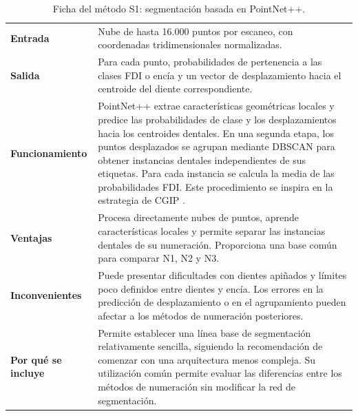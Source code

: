 \begin{table}[htbp]
    \centering
    \begin{tabular}{p{} >{\raggedright\arraybackslash}p{}}
         \hline 
         \textbf{Entrada} &
         Nube de hasta 16.000 puntos por escaneo, con coordenadas tridimensionales normalizadas. \\

         \textbf{Salida} &
         Para cada punto, probabilidades de pertenencia a las clases FDI o encía y un vector de desplazamiento hacia el centroide del diente correspondiente. \\

         \textbf{Funcionamiento} &
         PointNet++ \cite{qiPointNetDeepHierarchical2017} extrae características geométricas locales y predice las probabilidades de clase y los desplazamientos hacia los centroides dentales. En una segunda etapa, los puntos desplazados se agrupan mediante DBSCAN \cite{DBLP:conf/kdd/EsterKSX96} para obtener instancias dentales independientes de sus etiquetas. Para cada instancia se calcula la media de las probabilidades FDI. Este procedimiento se inspira en la estrategia de CGIP \cite{ben-hamadou3DTeethSeg223DTeeth2023}. \\

         \textbf{Ventajas} &
         Procesa directamente nubes de puntos, aprende características locales y permite separar las instancias dentales de su numeración. Proporciona una base común para comparar N1, N2 y N3. \\

         \textbf{Inconvenientes} &
         Puede presentar dificultades con dientes apiñados y límites poco definidos entre dientes y encía. Los errores en la predicción de desplazamiento o en el agrupamiento pueden afectar a los métodos de numeración posteriores. \\

         \textbf{Por qué se incluye} &
         Permite establecer una línea base de segmentación relativamente sencilla, siguiendo la recomendación de comenzar con una arquitectura menos compleja. Su utilización común permite evaluar las diferencias entre los métodos de numeración sin modificar la red de segmentación. \\
         \hline
    \end{tabular}
    \caption{Ficha del método S1: segmentación basada en PointNet++.}
    \label{tab:metodo-s1}
\end{table}

